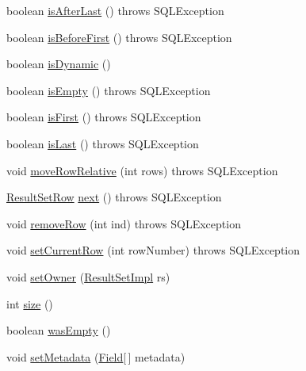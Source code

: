 \begin{DoxyCompactItemize}
\item 
boolean \mbox{\hyperlink{classcom_1_1mysql_1_1jdbc_1_1_row_data_dynamic_aeb4bc5a55d234a0c4af074cd0d32b352}{is\+After\+Last}} ()  throws S\+Q\+L\+Exception 
\item 
boolean \mbox{\hyperlink{classcom_1_1mysql_1_1jdbc_1_1_row_data_dynamic_a6cfc796696d9202761004405808df049}{is\+Before\+First}} ()  throws S\+Q\+L\+Exception 
\item 
boolean \mbox{\hyperlink{classcom_1_1mysql_1_1jdbc_1_1_row_data_dynamic_a82708299ee9a3ef5ebcab85a59ba9c70}{is\+Dynamic}} ()
\item 
boolean \mbox{\hyperlink{classcom_1_1mysql_1_1jdbc_1_1_row_data_dynamic_ae6bd51c674ff4442a649d4c3606d1aa6}{is\+Empty}} ()  throws S\+Q\+L\+Exception 
\item 
boolean \mbox{\hyperlink{classcom_1_1mysql_1_1jdbc_1_1_row_data_dynamic_a7f7a86fb22556f5ed0fdb8a115008c83}{is\+First}} ()  throws S\+Q\+L\+Exception 
\item 
boolean \mbox{\hyperlink{classcom_1_1mysql_1_1jdbc_1_1_row_data_dynamic_a40c7f46703795e1c0a508668f82a02fe}{is\+Last}} ()  throws S\+Q\+L\+Exception 
\item 
void \mbox{\hyperlink{classcom_1_1mysql_1_1jdbc_1_1_row_data_dynamic_a4e4efbc17c848aff355ecbb68b2646ec}{move\+Row\+Relative}} (int rows)  throws S\+Q\+L\+Exception 
\item 
\mbox{\hyperlink{classcom_1_1mysql_1_1jdbc_1_1_result_set_row}{Result\+Set\+Row}} \mbox{\hyperlink{classcom_1_1mysql_1_1jdbc_1_1_row_data_dynamic_af940fe3daed4a966db30feb64581dfe6}{next}} ()  throws S\+Q\+L\+Exception 
\item 
void \mbox{\hyperlink{classcom_1_1mysql_1_1jdbc_1_1_row_data_dynamic_a96a481601d6ef8046687071a42abe97b}{remove\+Row}} (int ind)  throws S\+Q\+L\+Exception 
\item 
void \mbox{\hyperlink{classcom_1_1mysql_1_1jdbc_1_1_row_data_dynamic_aab0a24e677281551b2f7e03e3ffd9c87}{set\+Current\+Row}} (int row\+Number)  throws S\+Q\+L\+Exception 
\item 
void \mbox{\hyperlink{classcom_1_1mysql_1_1jdbc_1_1_row_data_dynamic_a287111757c143aafaad4ebb656bd73a5}{set\+Owner}} (\mbox{\hyperlink{classcom_1_1mysql_1_1jdbc_1_1_result_set_impl}{Result\+Set\+Impl}} rs)
\item 
int \mbox{\hyperlink{classcom_1_1mysql_1_1jdbc_1_1_row_data_dynamic_a2cd7d4bfa00589c4356506d55c88a8e0}{size}} ()
\item 
boolean \mbox{\hyperlink{classcom_1_1mysql_1_1jdbc_1_1_row_data_dynamic_a40a524d57dd4356ce8ec38796ae68e38}{was\+Empty}} ()
\item 
void \mbox{\hyperlink{classcom_1_1mysql_1_1jdbc_1_1_row_data_dynamic_a49f5410d7de8866f83072ff1a5cd7bcc}{set\+Metadata}} (\mbox{\hyperlink{classcom_1_1mysql_1_1jdbc_1_1_field}{Field}}\mbox{[}$\,$\mbox{]} metadata)
\end{DoxyCompactItemize}
